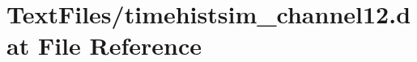 \hypertarget{TextFiles_2timehistsim__channel12_8dat}{}\section{Text\+Files/timehistsim\+\_\+channel12.dat File Reference}
\label{TextFiles_2timehistsim__channel12_8dat}
